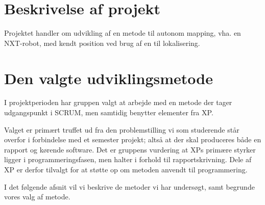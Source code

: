 \section{Beskrivelse af projekt}
Projektet handler om udvikling af en metode til autonom mapping, vha. en \legoms NXT\textregistered-robot, med kendt position ved brug af en \mskinect til lokalisering.

\section{Den valgte udviklingsmetode}\label{valgtmetode}
I projektperioden har gruppen valgt at arbejde med en metode der tager udgangspunkt i SCRUM, men samtidig benytter elementer fra XP.

Valget er primært truffet ud fra den problemstilling vi som studerende står overfor i forbindelse med et semester projekt; altså at der skal produceres både en rapport og kørende software.
Det er gruppens vurdering at XPs primære styrker ligger i programmeringsfasen, men halter i forhold til rapportskrivning.
Dele af XP er derfor tilvalgt for at støtte op om metoden anvendt til programmering.

I det følgende afsnit vil vi beskrive de metoder vi har undersøgt, samt begrunde vores valg af metode.